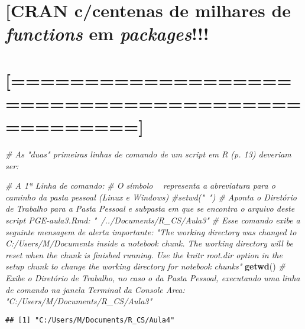 \documentclass[]{article}
\newenvironment{Shaded}{\begin{snugshade}}{\end{snugshade}}
\newcommand{\KeywordTok}[1]{\textcolor[rgb]{0.13,0.29,0.53}{\textbf{#1}}}
\newcommand{\CommentTok}[1]{\textcolor[rgb]{0.56,0.35,0.01}{\textit{#1}}}
\newcommand{\NormalTok}[1]{#1}
\begin{document}
\section{\texorpdfstring{{[}CRAN c/centenas de milhares de
\emph{functions} em
\emph{packages}!!!}{{[}CRAN c/centenas de milhares de functions em packages!!!}}\label{cran-ccentenas-de-milhares-de-functions-em-packages}

\section{{[}================================================{]}}\label{section-1}

\begin{Shaded}
\begin{Highlighting}[]
\CommentTok{# As "duas" primeiras linhas de comando de um script em R (p. 13) deveriam ser:}

\CommentTok{# A 1ª Linha de comando:}
\CommentTok{# O símbolo ~ representa a abreviatura para o caminho da pasta pessoal (Linux e Windows)}
\CommentTok{#setwd("~") # Aponta o Diretório de Trabalho para a Pasta Pessoal e subpasta em que se encontra o arquivo deste script PGE-aula3.Rmd: "~/../Documents/R_CS/Aula3"}
\CommentTok{# Esse comando exibe a seguinte mensagem de alerta importante: "The working directory was changed to C:/Users/M/Documents inside a notebook chunk. The working directory will be reset when the chunk is finished running. Use the knitr root.dir option in the setup chunk to change the working directory for notebook chunks"}
\KeywordTok{getwd}\NormalTok{()    }\CommentTok{# Exibe  o Diretório de Trabalho, no caso o da Pasta Pessoal, executando uma linha de comando na janela Terminal da Console Area: "C:/Users/M/Documents/R_CS/Aula3"}
\end{Highlighting}
\end{Shaded}

\begin{verbatim}
## [1] "C:/Users/M/Documents/R_CS/Aula4"
\end{verbatim}
\end{document}
